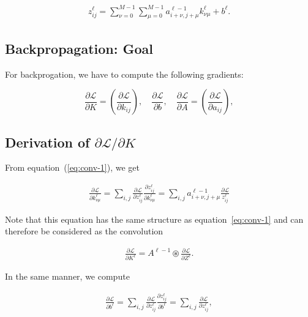 \documentclass[a4paper,10pt]{article}
\def\Loss{\mathcal{L}}
\begin{document}
\begin{align}
    \label{eq:conv-1}
    z_{ij}^{\ell} = \sum_{\nu=0}^{M-1} \sum_{\mu=0}^{M-1} a_{i+\nu, j+\mu}^{\ell-1} k_{\nu \mu}^\ell + b^\ell.
\end{align}

\subsection*{Backpropagation: Goal}

For backprogation, we have to compute the following gradients:

\begin{equation}
    \frac{\partial \Loss}{\partial K} = \left( \frac{\partial \Loss}{\partial k_{ij}} \right), \quad 
    \frac{\partial \Loss}{\partial b}, \quad \frac{\partial \Loss}{\partial A} = \left( \frac{\partial \Loss}{\partial a_{ij}} \right),
\end{equation}

\subsection*{Derivation of $\partial \Loss / \partial K$}

From equation~(\ref{eq:conv-1}), we get

\begin{align*}
    \frac{\partial \Loss}{\partial k_{\nu\mu}^\ell} = \sum_{i,j} 
    \frac{\partial \Loss}{\partial z_{ij}^{\ell}} 
    \frac{\partial{z_{ij}^{\ell}}}{\partial k_{\nu\mu}^\ell} = 
    \sum_{i,j} a_{i + \nu, j + \mu}^{\ell -1} \frac{\partial \Loss}{z_{ij}^{\ell}}
\end{align*}

Note that this equation has the same structure as equation~\ref{eq:conv-1} and
can therefore be considered as the convolution

\begin{align*}
    \boxed{    
    \frac{\partial \Loss}{\partial K^\ell} = A^{\ell-1} \circledast \frac{\partial \Loss}{\partial Z^{\ell}}.
    }
\end{align*}

In the same manner, we compute

\begin{align*}
    \frac{\partial \Loss}{\partial b^\ell} = \sum_{i,j} 
    \frac{\partial \Loss}{\partial z_{ij}^\ell} \frac{\partial z_{ij}^\ell}{\partial b^\ell} 
    = \sum_{i,j} \frac{\partial \Loss}{\partial z_{ij}^\ell},
\end{align*}
\end{document}
